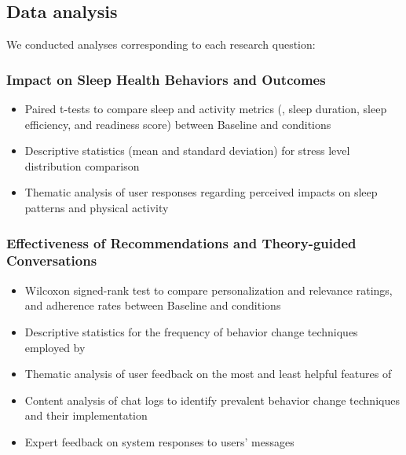 \subsection{Data analysis}
We conducted analyses corresponding to each research question:

\subsubsection{Impact on Sleep Health Behaviors and Outcomes}
\begin{itemize}
\item Paired t-tests to compare sleep and activity metrics (\eg, sleep duration, sleep efficiency, and readiness score) between Baseline and \name{} conditions
\item Descriptive statistics (mean and standard deviation) for stress level distribution comparison
\item Thematic analysis of user responses regarding perceived impacts on sleep patterns and physical activity
\end{itemize}
\subsubsection{Effectiveness of Recommendations and Theory-guided Conversations}
\begin{itemize}
\item Wilcoxon signed-rank test to compare personalization and relevance ratings, and adherence rates between Baseline and \name{} conditions
\item Descriptive statistics for the frequency of behavior change techniques employed by \name{}
\item Thematic analysis of user feedback on the most and least helpful features of \name{}
\item Content analysis of chat logs to identify prevalent behavior change techniques and their implementation
\item Expert feedback on system responses to users' messages
\end{itemize}

